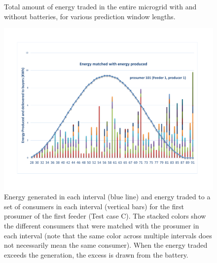 \begin{figure}[ht]
\caption{Total amount of energy traded in the entire microgrid with and without batteries, for various prediction window lengths.}
\label{fig:multihorizon}
\end{figure}


\begin{figure}[t]
	\centering
\includegraphics[width=1\columnwidth]{diagrams/prosumer101.pdf}
	\caption{Energy generated in each interval (blue line) and energy traded to a set of consumers in each interval (vertical bars) for the first prosumer of the first feeder (Test case C). The stacked colors show the different consumers that were matched with the prosumer in each interval (note that the same color across multiple intervals does not necessarily mean the same consumer). When the energy traded exceeds the generation, the excess is drawn from the battery.}
	\label{fig:allocate1NRG}
\end{figure}

